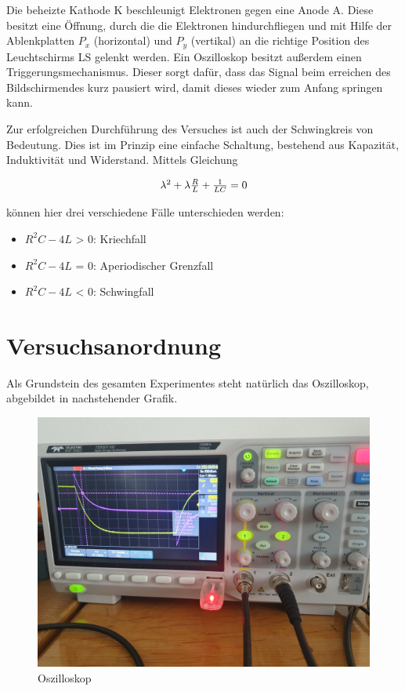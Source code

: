 \documentclass[12pt,a4paper,twoside]{article}
\begin{document}
\noindent
Die beheizte Kathode K beschleunigt Elektronen gegen eine Anode A. Diese besitzt eine Öffnung, durch die die Elektronen hindurchfliegen und mit Hilfe der Ablenkplatten $P_{x}$ (horizontal) und $P_{y}$ (vertikal) an die richtige Position des Leuchtschirms LS gelenkt werden. 
Ein Oszilloskop besitzt außerdem einen Triggerungsmechanismus. Dieser sorgt dafür, dass das Signal beim erreichen des Bildschirmendes kurz pausiert wird, damit dieses wieder zum Anfang springen kann. \newline

\noindent
Zur erfolgreichen Durchführung des Versuches ist auch der Schwingkreis von Bedeutung. Dies ist im Prinzip eine einfache Schaltung, bestehend aus Kapazität, Induktivität und Widerstand.
Mittels Gleichung

    \begin{equation}
        \label{eq:SchwingkreisGleichungFälle}
        \centerline{$\lambda^2 + \lambda \frac{R}{L} + \frac{1}{LC} = 0 $}
    \end{equation}

\noindent
können hier drei verschiedene Fälle unterschieden werden:

\begin{itemize}
    \item $R^2C - 4L$ > 0: Kriechfall
    \item $R^2C - 4L$ = 0: Aperiodischer Grenzfall
    \item $R^2C - 4L$ < 0: Schwingfall
\end{itemize}

\section{Versuchsanordnung} %

Als Grundstein des gesamten Experimentes steht natürlich das Oszilloskop, abgebildet in nachstehender Grafik.

\begin{figure}[H]
    \centering
    \includegraphics[width=0.6\linewidth, angle=0]{nudes/Osziloskop.jpg}
    \caption{Oszilloskop}
    \label{fig:Oszilloskop}
\end{figure}
\end{document}
